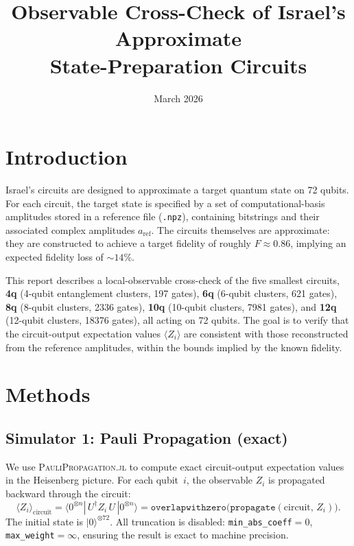 \documentclass[11pt]{article}
\title{Observable Cross-Check of Israel's Approximate\\State-Preparation Circuits}
\author{}
\date{March 2026}
\begin{document}
\maketitle

\section{Introduction}

Israel's circuits are designed to approximate a target quantum state on 72 qubits.
For each circuit, the target state is specified by a set of computational-basis amplitudes stored in a reference file (\texttt{.npz}), containing bitstrings and their associated complex amplitudes $a_{\mathrm{ref}}$.
The circuits themselves are approximate: they are constructed to achieve a target fidelity of roughly $F\approx 0.86$, implying an expected fidelity loss of $\sim 14\%$.

This report describes a local-observable cross-check of the five smallest circuits, \textbf{4q} (4-qubit entanglement clusters, 197 gates), \textbf{6q} (6-qubit clusters, 621 gates), \textbf{8q} (8-qubit clusters, 2336 gates), \textbf{10q} (10-qubit clusters, 7981 gates), and \textbf{12q} (12-qubit clusters, 18376 gates), all acting on 72 qubits.
The goal is to verify that the circuit-output expectation values $\langle Z_i \rangle$ are consistent with those reconstructed from the reference amplitudes, within the bounds implied by the known fidelity.

\section{Methods}

\subsection{Simulator 1: Pauli Propagation (exact)}

We use \textsc{PauliPropagation.jl} to compute exact circuit-output expectation values in the Heisenberg picture.
For each qubit~$i$, the observable $Z_i$ is propagated backward through the circuit:
\begin{equation}
  \langle Z_i \rangle_{\mathrm{circuit}} = \langle 0^{\otimes n} | \, U^\dagger Z_i \, U \, | 0^{\otimes n} \rangle
  = \texttt{overlapwithzero}\!\bigl(\texttt{propagate}(\text{circuit},\, Z_i)\bigr).
\end{equation}
The initial state is $|0\rangle^{\otimes 72}$.
All truncation is disabled: \texttt{min\_abs\_coeff}${}=0$, \texttt{max\_weight}${}=\infty$, ensuring the result is exact to machine precision.
\end{document}
